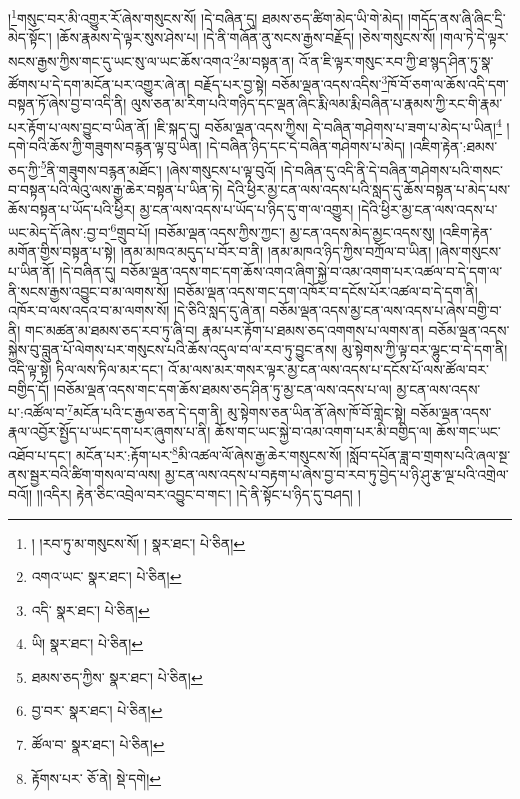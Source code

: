 །\footnote{། །རབ་ཏུ་མ་གསུངས་སོ། །  སྣར་ཐང་།  པེ་ཅིན། }གསུང་བར་མི་འགྱུར་རོ་ཞེས་གསུངས་སོ། །དེ་བཞིན་དུ། ཐམས་ཅད་ཚིག་མེད་ཡི་གེ་མེད། །གདོད་ནས་ཞི་ཞིང་དྲི་མེད་སྟོང་། །ཆོས་རྣམས་དེ་ལྟར་སུས་ཤེས་པ། །དེ་ནི་གཞོན་ནུ་སངས་རྒྱས་བརྗོད། །ཅེས་གསུངས་སོ། །གལ་ཏེ་དེ་ལྟར་སངས་རྒྱས་ཀྱིས་གང་དུ་ཡང་སུ་ལ་ཡང་ཆོས་འགའ་\footnote{འགའ་ཡང་  སྣར་ཐང་།  པེ་ཅིན། }མ་བསྟན་ན། འོ་ན་ཇི་ལྟར་གསུང་རབ་ཀྱི་ཐ་སྙད་ཤིན་ཏུ་སྣ་ཚོགས་པ་དེ་དག་མངོན་པར་འགྱུར་ཞེ་ན། བརྗོད་པར་བྱ་སྟེ། བཅོམ་ལྡན་འདས་འདིས་\footnote{འདི་  སྣར་ཐང་།  པེ་ཅིན། }ཁོ་བོ་ཅག་ལ་ཆོས་འདི་དག་བསྟན་ཏོ་ཞེས་བྱ་བ་འདི་ནི། ལུས་ཅན་མ་རིག་པའི་གཉིད་དང་ལྡན་ཞིང་རྨི་ལམ་རྨི་བཞིན་པ་རྣམས་ཀྱི་རང་གི་རྣམ་པར་རྟོག་པ་ལས་བྱུང་བ་ཡིན་ནོ། །ཇི་སྐད་དུ། བཅོམ་ལྡན་འདས་ཀྱིས། དེ་བཞིན་གཤེགས་པ་ཟག་པ་མེད་པ་ཡིན།\footnote{ཡི།  སྣར་ཐང་།  པེ་ཅིན། } །དགེ་བའི་ཆོས་ཀྱི་གཟུགས་བརྙན་ལྟ་བུ་ཡིན། །དེ་བཞིན་ཉིད་དང་དེ་བཞིན་གཤེགས་པ་མེད། །འཇིག་རྟེན་:ཐམས་ཅད་ཀྱི་\footnote{ཐམས་ཅད་ཀྱིས་  སྣར་ཐང་།  པེ་ཅིན། }ནི་གཟུགས་བརྙན་མཐོང་། །ཞེས་གསུངས་པ་ལྟ་བུའོ། །དེ་བཞིན་དུ་འདི་ནི་དེ་བཞིན་གཤེགས་པའི་གསང་བ་བསྟན་པའི་ལེའུ་ལས་རྒྱ་ཆེར་བསྟན་པ་ཡིན་ཏེ། དེའི་ཕྱིར་མྱ་ངན་ལས་འདས་པའི་སླད་དུ་ཆོས་བསྟན་པ་མེད་པས་ཆོས་བསྟན་པ་ཡོད་པའི་ཕྱིར། མྱ་ངན་ལས་འདས་པ་ཡོད་པ་ཉིད་དུ་ག་ལ་འགྱུར། །དེའི་ཕྱིར་མྱ་ངན་ལས་འདས་པ་ཡང་མེད་དོ་ཞེས་:བྱ་བ་\footnote{བྱ་བར་  སྣར་ཐང་།  པེ་ཅིན། }གྲུབ་པོ། །བཅོམ་ལྡན་འདས་ཀྱིས་ཀྱང་། མྱ་ངན་འདས་མེད་མྱང་འདས་སུ། །འཇིག་རྟེན་མགོན་གྱིས་བསྟན་པ་སྟེ། །ནམ་མཁའ་མདུད་པ་བོར་བ་ནི། །ནམ་མཁའ་ཉིད་ཀྱིས་བཀྲོལ་བ་ཡིན། །ཞེས་གསུངས་པ་ཡིན་ནོ། །དེ་བཞིན་དུ། བཅོམ་ལྡན་འདས་གང་དག་ཆོས་འགའ་ཞིག་སྐྱེ་བ་འམ་འགག་པར་འཚལ་བ་དེ་དག་ལ་ནི་སངས་རྒྱས་འབྱུང་བ་མ་ལགས་སོ། །བཅོམ་ལྡན་འདས་གང་དག་འཁོར་བ་དངོས་པོར་འཚལ་བ་དེ་དག་ནི། འཁོར་བ་ལས་འདའ་བ་མ་ལགས་སོ། །དེ་ཅིའི་སླད་དུ་ཞེ་ན། བཅོམ་ལྡན་འདས་མྱ་ངན་ལས་འདས་པ་ཞེས་བགྱི་བ་ནི། གང་མཚན་མ་ཐམས་ཅད་རབ་ཏུ་ཞི་བ། རྣམ་པར་རྟོག་པ་ཐམས་ཅད་འགགས་པ་ལགས་ན། བཅོམ་ལྡན་འདས་སྐྱེས་བུ་བླུན་པོ་ལེགས་པར་གསུངས་པའི་ཆོས་འདུལ་བ་ལ་རབ་ཏུ་བྱུང་ནས། མུ་སྟེགས་ཀྱི་ལྟ་བར་ལྷུང་བ་དེ་དག་ནི། འདི་ལྟ་སྟེ། ཏིལ་ལས་ཏིལ་མར་དང་། འོ་མ་ལས་མར་གསར་ལྟར་མྱ་ངན་ལས་འདས་པ་དངོས་པོ་ལས་ཚོལ་བར་བགྱིད་དོ། །བཅོམ་ལྡན་འདས་གང་དག་ཆོས་ཐམས་ཅད་ཤིན་ཏུ་མྱ་ངན་ལས་འདས་པ་ལ། མྱ་ངན་ལས་འདས་པ་:འཚོལ་བ་\footnote{ཚོལ་བ་  སྣར་ཐང་།  པེ་ཅིན། }མངོན་པའི་ང་རྒྱལ་ཅན་དེ་དག་ནི། མུ་སྟེགས་ཅན་ཡིན་ནོ་ཞེས་ཁོ་བོ་གླེང་སྟེ། བཅོམ་ལྡན་འདས་རྣལ་འབྱོར་སྤྱོད་པ་ཡང་དག་པར་ཞུགས་པ་ནི། ཆོས་གང་ཡང་སྐྱེ་བ་འམ་འགག་པར་མི་བགྱིད་ལ། ཆོས་གང་ཡང་འཐོབ་པ་དང་། མངོན་པར་:རྟོག་པར་\footnote{རྟོགས་པར་  ཅོ་ནེ།  སྡེ་དགེ། }མི་འཚལ་ལོ་ཞེས་རྒྱ་ཆེར་གསུངས་སོ། །སློབ་དཔོན་ཟླ་བ་གྲགས་པའི་ཞལ་སྔ་ནས་སྦྱར་བའི་ཚིག་གསལ་བ་ལས། མྱ་ངན་ལས་འདས་པ་བརྟག་པ་ཞེས་བྱ་བ་རབ་ཏུ་བྱེད་པ་ཉི་ཤུ་རྩ་ལྔ་པའི་འགྲེལ་བའོ།། །།འདིར། རྟེན་ཅིང་འབྲེལ་བར་འབྱུང་བ་གང་། །དེ་ནི་སྟོང་པ་ཉིད་དུ་བཤད། །
